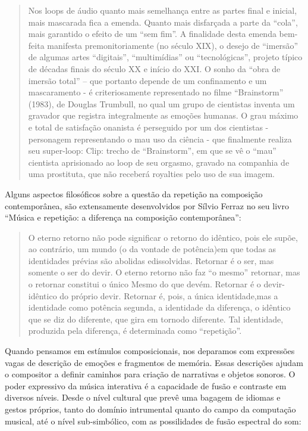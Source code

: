 \documentclass{ppgmus}
\begin{document}
\begin{quote}
 Nos loops de áudio quanto mais semelhança entre as partes final e inicial, mais mascarada fica a
emenda. Quanto mais disfarçada a parte da ``cola'', mais garantido o efeito de um ``sem fim''. A finalidade
desta emenda bem-feita manifesta premonitoriamente (no século XIX), o desejo de ``imersão'' de algumas
artes ``digitais'', ``multimídias'' ou ``tecnológicas'', projeto típico de décadas finais do século XX e início do
XXI. O sonho da ``obra de imersão total'' – que portanto depende de um confinamento e um mascaramento -
é criteriosamente representado no filme ``Brainstorm'' (1983), de Douglas Trumbull, no qual um grupo de
cientistas inventa um gravador que registra integralmente as emoções humanas. O grau máximo e total de
satisfação onanista é perseguido por um dos cientistas - personagem representando o mau uso da ciência -
que finalmente realiza seu super-loop:
Clip: trecho de ``Brainstorm'', em que se vê o ``mau'' cientista aprisionado ao loop de seu orgasmo, gravado na
companhia de uma prostituta, que não receberá royalties pelo uso de sua imagem. \cite{caesarloop}
\end{quote} 



Alguns aspectos filosóficos sobre a questão da repetição na composição contemporânea,
são extensamente desenvolvidos por Sílvio Ferraz no seu livro 
``Música e repetição: a diferença na composição contemporânea'':
 
\begin{quote}
O eterno retorno não pode significar o retorno do idêntico, pois ele supõe, 
ao contrário, um mundo (o da vontade de potência)em que todas as identidades 
prévias são abolidas edissolvidas. Retornar é o ser, mas somente o ser do devir. 
O eterno retorno não faz ``o mesmo'' retornar, mas o retornar constitui o único 
Mesmo do que devém. Retornar é o devir-idêntico do próprio devir. Retornar é, 
pois, a única identidade,mas a identidade como potência segunda, a identidade da 
diferença, o idêntico que se diz do diferente, que gira em tornodo diferente. 
Tal identidade, produzida pela diferença, é determinada como ``repetição''. \cite{ferraz1998musica}
\end{quote}


Quando pensamos em estímulos composicionais, nos deparamos com expressões
vagas de descrição de emoções e fragmentos de memória. Essas descrições
ajudam o compositor a definir caminhos para criação de narrativas e 
objetos sonoros. O poder expressivo da música interativa é a capacidade
de fusão e contraste em diversos níveis. Desde o nível cultural que prevê
uma bagagem de idiomas e gestos próprios, tanto do domínio intrumental quanto
do campo da computação musical, até o nível sub-simbólico, com as possilidades
de fusão espectral do som:
\end{document}
